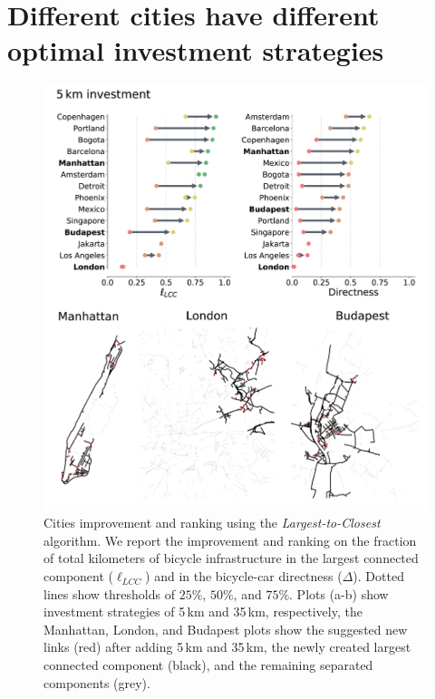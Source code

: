 \section{Different cities have different optimal investment strategies}

\begin{figure}[htp!]
  \centering
  \includegraphics[width=\textwidth]{images/datadriven/5km.png}
  \caption[Cities bicycle connectivity improvement 5 new kilometers]{Cities improvement and ranking using the \emph{Largest-to-Closest} algorithm. We report the improvement and ranking on the fraction of total kilometers of bicycle infrastructure in the largest connected component ($\ell_{LCC}$) and in the bicycle-car directness ($\Delta$). Dotted lines show thresholds of $25\%$, $50\%$, and $75\%$. Plots (a-b) show investment strategies of 5\,km and 35\,km, respectively, the Manhattan, London, and Budapest plots show the suggested new links (red) after adding 5\,km and 35\,km, the newly created largest connected component (black), and the remaining separated components (grey).}
  \label{fig:Improvement5}
\end{figure}

